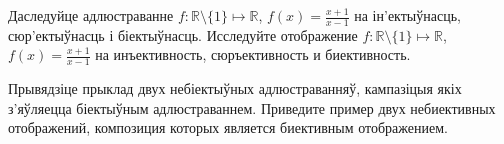 \begin{problemList}
	\problemItemSimple
	{Даследуйце адлюстраванне $f: \mathbb{R} \setminus \{1\} \mapsto \mathbb{R}$, $f(x) = \frac{x+1}{x-1}$ на ін'ектыўнасць, сюр'ектыўнасць і біектыўнасць. }
	{Исследуйте отображение $f: \mathbb{R} \setminus \{1\} \mapsto \mathbb{R}$, $f(x) = \frac{x+1}{x-1}$ на инъективность, сюръективность и биективность.}
	
	\problemItemSimple
	{Прывядзіце прыклад двух небіектыўных адлюстраванняў, кампазіцыя якіх з'яўляецца біектыўным адлюстраваннем.}
	{Приведите пример двух небиективных отображений, композиция которых является биективным отображением.}
	
\end{problemList}	


